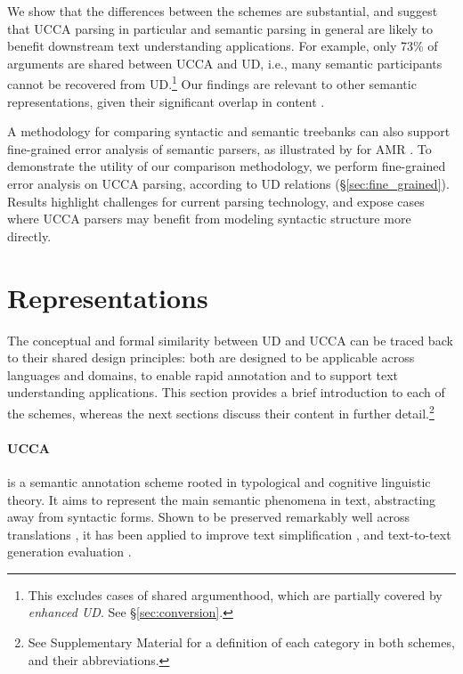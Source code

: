\documentclass[11pt,a4paper]{article}
\begin{document}
  We show that the differences between the schemes are substantial, and suggest that
  UCCA parsing in particular and semantic parsing in general are likely to benefit
  downstream text understanding applications.
  For example, only 73\% of arguments are shared between UCCA and UD,
  i.e., many semantic participants cannot be recovered from UD.\footnote{This excludes cases of shared 
  argumenthood, which are partially covered by \textit{enhanced UD}. See \S\ref{sec:conversion}.}
  Our findings are relevant to other semantic representations, given their 
  significant overlap in content \cite{abend2017state}.
    
  
  A methodology for comparing syntactic and semantic treebanks can also support fine-grained error 
  analysis of semantic parsers, as illustrated by \citet{szubert2018structured} 
  for AMR \citep{banarescu2013abstract}.
  To demonstrate the utility of our comparison methodology,
  we perform fine-grained error analysis on UCCA parsing,
  according to UD relations (\S\ref{sec:fine_grained}).
  Results highlight challenges for current parsing technology,
  and expose cases where UCCA parsers may benefit from modeling syntactic structure more directly.



\section{Representations}\label{sec:representations}

  The conceptual and formal similarity between UD and UCCA can be traced back
  to their shared design principles:
  both are designed to be applicable across languages and domains, 
  to enable rapid annotation and to support text understanding
  applications. This section provides a brief introduction to each of the schemes, whereas
  the next sections discuss their content in further
  detail.\footnote{See Supplementary Material for a definition of each category in both schemes,
  and their abbreviations.}
  


\paragraph{UCCA}\label{sec:ucca}
  is a semantic annotation scheme rooted in typological 
  and cognitive linguistic theory.
  It aims to represent the main semantic phenomena in text, abstracting away from syntactic forms.
  Shown to be preserved remarkably well across translations \citep{sulem2015conceptual}, it has been applied to
  improve text simplification \citep{sulem2018simple},
  and text-to-text generation evaluation \citep{birch2016hume,choshen2018usim,sulem2018samsa}.
\end{document}
